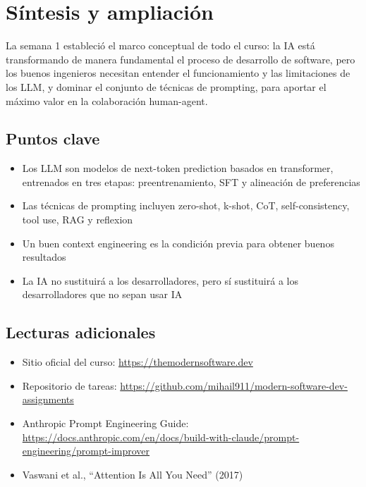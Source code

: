 \documentclass[a4paper]{article}
\begin{document}
\section{Síntesis y ampliación}

La semana 1 estableció el marco conceptual de todo el curso: la IA está transformando de manera fundamental el proceso de desarrollo de software, pero los buenos ingenieros necesitan entender el funcionamiento y las limitaciones de los LLM, y dominar el conjunto de técnicas de prompting, para aportar el máximo valor en la colaboración human-agent.

\subsection{Puntos clave}

\begin{itemize}
    \item Los LLM son modelos de next-token prediction basados en transformer, entrenados en tres etapas: preentrenamiento, SFT y alineación de preferencias
    \item Las técnicas de prompting incluyen zero-shot, k-shot, CoT, self-consistency, tool use, RAG y reflexion
    \item Un buen context engineering es la condición previa para obtener buenos resultados
    \item La IA no sustituirá a los desarrolladores, pero sí sustituirá a los desarrolladores que no sepan usar IA
\end{itemize}

\subsection{Lecturas adicionales}

\begin{itemize}
    \item Sitio oficial del curso: \url{https://themodernsoftware.dev}
    \item Repositorio de tareas: \url{https://github.com/mihail911/modern-software-dev-assignments}
    \item Anthropic Prompt Engineering Guide: \url{https://docs.anthropic.com/en/docs/build-with-claude/prompt-engineering/prompt-improver}
    \item Vaswani et al., ``Attention Is All You Need'' (2017)
\end{itemize}

\end{document}
